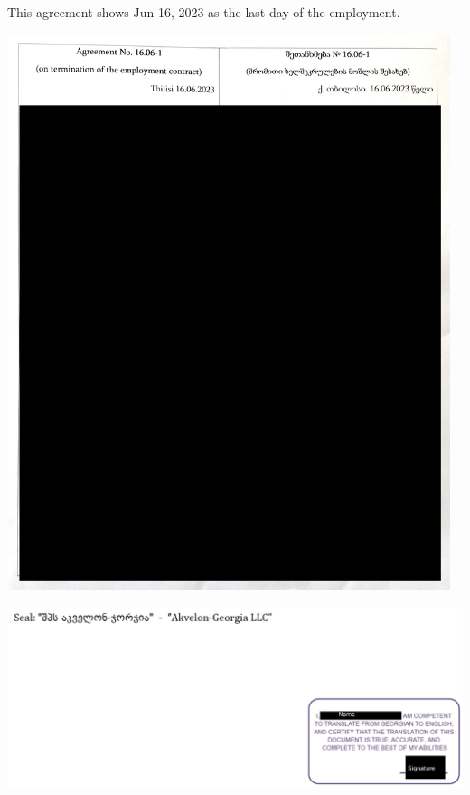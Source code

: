 
This agreement shows Jun 16, 2023 as the last day of the employment.

\begin{center}
    \includegraphics[width=35em]{termination-agreement_public}
\end{center}
\pagebreak

\includegraphics[width=\textwidth]{termination-agreement_tr_public}

\pagebreak
